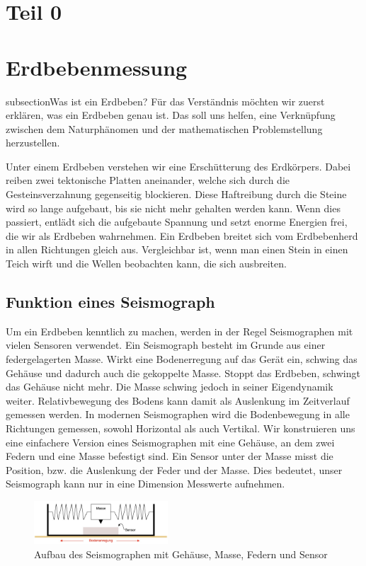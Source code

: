%
%
\section{Teil 0\label{erdbeben:section:teil0}}
\section{Erdbebenmessung}
subsection{Was ist ein Erdbeben?}
Für das Verständnis möchten wir zuerst erklären, was ein Erdbeben genau ist.
Das soll uns helfen, eine Verknüpfung zwischen dem Naturphänomen und der mathematischen Problemstellung herzustellen.

Unter einem Erdbeben verstehen wir eine Erschütterung des Erdkörpers.
Dabei reiben zwei tektonische Platten aneinander, welche sich durch die Gesteinsverzahnung gegenseitig blockieren.
Diese Haftreibung durch die Steine wird so lange aufgebaut, bis sie nicht mehr gehalten werden kann.
Wenn dies passiert, entlädt sich die aufgebaute Spannung und setzt enorme Energien frei, die wir als Erdbeben wahrnehmen.
Ein Erdbeben breitet sich vom Erdbebenherd in allen Richtungen gleich aus.
Vergleichbar ist, wenn man einen Stein in einen Teich wirft und die Wellen beobachten kann, die sich ausbreiten.

\subsection{Funktion eines Seismograph}
Um ein Erdbeben kenntlich zu machen, werden in der Regel Seismographen mit vielen Sensoren verwendet. 
Ein Seismograph besteht im Grunde aus einer federgelagerten Masse. Wirkt eine Bodenerregung auf das Gerät ein, schwing das Gehäuse und dadurch auch die gekoppelte Masse. 
Stoppt das Erdbeben, schwingt das Gehäuse nicht mehr. 
Die Masse schwing jedoch in seiner Eigendynamik weiter. 
Relativbewegung des Bodens kann damit als Auslenkung im Zeitverlauf gemessen werden.
In modernen Seismographen wird die Bodenbewegung in alle Richtungen gemessen, sowohl Horizontal als auch Vertikal. 
Wir konstruieren uns eine einfachere Version eines Seismographen mit eine Gehäuse, an dem zwei Federn und eine Masse befestigt sind. 
Ein Sensor unter der Masse misst die Position, bzw. die Auslenkung der Feder und der Masse.
Dies bedeutet, unser Seismograph kann nur in eine Dimension Messwerte aufnehmen. 

\begin{figure}
 \begin{center}
 \includegraphics[width=5cm]{papers/erdbeben/Apperatur}
 \caption{Aufbau des Seismographen mit Gehäuse, Masse, Federn und Sensor}
 \end{center}
\end{figure}


